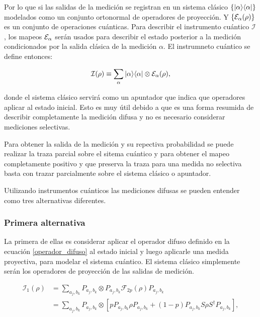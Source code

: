 Por lo que si las salidas de la medición se registran en un sistema clásico $\{|\alpha\rangle \langle \alpha |\}$ modelados como un conjunto ortonormal de operadores de proyección. Y $\{\mathcal{E}_\alpha(\rho)\}$ es un conjunto de operaciones cuánticas. Para describir el instrumento cuántico $\mathcal{I}$, los mapeos $\mathcal{E}_\alpha$ serán usados para describir  el estado posterior a la medición condicionados por la salida clásica de la medición $\alpha$. El instrumneto cuántico se define entonces:

\begin{equation}
    \mathcal{I}(\rho)\equiv\sum_\alpha |\alpha\rangle \langle\alpha|\otimes \mathcal{E}_\alpha(\rho),
\end{equation}


donde el sistema clásico servirá como un apuntador que indica que operadores aplicar al estado inicial. Esto es muy útil debido a que es una forma resumida de describir completamente la medición difusa y no es necesario considerar mediciones selectivas.


Para obtener la salida de la medición y su repectiva probabilidad se puede realizar la traza parcial sobre el sitema cuántico y para obtener el mapeo completamente positivo y que preserva la traza para una medida no selectiva basta con trazar parcialmente sobre el sistema clásico o apuntador.



Utilizando instrumentos cuánticos las mediciones difusas se pueden entender como tres alternativas diferentes. 

\subsubsection{Primera alternativa}
La primera de ellas es considerar aplicar el operador difuso definido en la ecuación {\ref{operador_difuso}} al estado inicial y luego aplicarle una medida proyectiva, para modelar el sistema cuántico. El sistema clásico simplemente serán los operadores de proyección de las salidas de medición.

\begin{equation}
    \begin{split}
        \mathcal{I}_1(\rho)&=\sum_{a_j,b_k}P_{a_j,b_k}\otimes P_{a_j,b_k} \mathcal{F}_{2p}(\rho) P_{a_j,b_k}\\
        &=\sum_{a_j,b_k}P_{a_j,b_k}\otimes[p P_{a_j,b_k}\rho P_{a_j,b_k}+(1-p)P_{a_j,b_k}S\rho S^\dagger P_{a_j,b_k}],
\end{split}
\end{equation}

